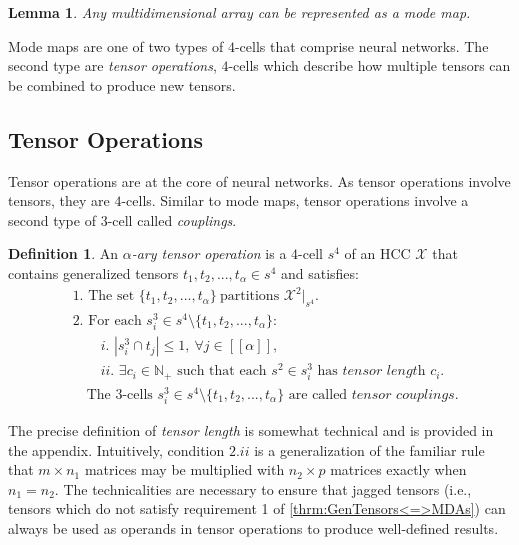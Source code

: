 \documentclass{article}
\theoremstyle{plain}
\newtheorem{lemma}[theorem]{Lemma}
\theoremstyle{definition}
\newtheorem{definition}[theorem]{Definition}
\theoremstyle{remark}
\begin{document}
\begin{lemma}
	Any multidimensional array can be represented as a mode map.
	\label{lem:MMs=>NonInjMDAs}
\end{lemma}

Mode maps are one of two types of $4$-cells that comprise neural networks. The second type are \textit{tensor operations}, $4$-cells which describe how multiple tensors can be combined to produce new tensors.
%
\subsection{Tensor Operations}
Tensor operations are at the core of neural networks. As tensor operations involve tensors, they are $4$-cells. Similar to mode maps, tensor operations involve a second type of $3$-cell called \textit{couplings}.
%

\begin{definition}
	\label{def:1SM}
	An $\alpha$\textit{-ary tensor operation} is a $4$-cell $s^4$ of an HCC $\mathcal{X}$ that contains generalized tensors $t_1, t_2, ..., t_{\alpha} \in s^4$ and satisfies:
	\begin{equation*}
		\begin{aligned}
			&\textit{1. } \text{The set } \{t_1, t_2, ..., t_{\alpha}\} \ \text{partitions } \mathcal{X}^2|_{s^4}.\\
			&\textit{2. } \text{For each } s^3_i \in s^4 \setminus \{t_1, t_2, ..., t_{\alpha}\}:\\
			&\qquad \textit{i. }|s^3_i \cap t_j| \leq 1, \ \forall j \in [[\alpha]],\\
			&\qquad \textit{ii. }\exists c_i \in \mathbb{N}_+ \text{ such that each } s^2 \in s^3_i \text{ has } \textit{tensor length } c_i.\\
			&\quad \text{The } 3 \text{-cells } s^3_i \in s^4 \setminus \{t_1, t_2, ..., t_{\alpha}\} \text{ are called }\textit{tensor couplings.}
		\end{aligned}
	\end{equation*}
\end{definition}
The precise definition of \textit{tensor length} is somewhat technical and is provided in the appendix. Intuitively, condition $2.ii$ is a generalization of the familiar rule that $m \times n_1$ matrices may be multiplied with $n_2 \times p$ matrices exactly when $n_1 = n_2$. The technicalities are necessary to ensure that jagged tensors (i.e., tensors which do not satisfy requirement 1 of \cref{thrm:GenTensors<=>MDAs}) can always be used as operands in tensor operations to produce well-defined results.
\end{document}
